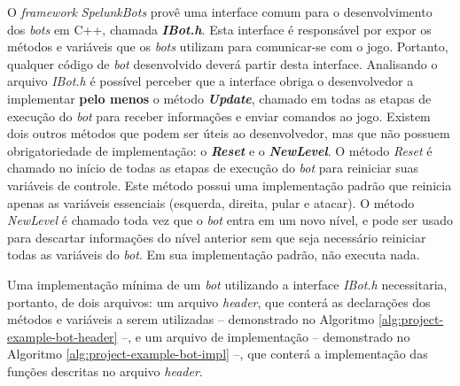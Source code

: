 O \textit{framework} \textit{SpelunkBots} provê uma interface comum para o
desenvolvimento dos \textit{bots} em C++, chamada \textbf{\textit{IBot.h}}. Esta
interface é responsável por expor os métodos e variáveis que os \textit{bots}
utilizam para comunicar-se com o jogo. Portanto, qualquer código de \textit{bot}
desenvolvido deverá partir desta interface. Analisando o arquivo \textit{IBot.h}
é possível perceber que a interface obriga o desenvolvedor a implementar
\textbf{pelo menos} o método \textbf{\textit{Update}}, chamado em todas as
etapas de execução do \textit{bot} para receber informações e enviar comandos ao
jogo. Existem dois outros métodos que podem ser úteis ao desenvolvedor, mas que
não possuem obrigatoriedade de implementação: o \textbf{\textit{Reset}} e o
\textbf{\textit{NewLevel}}. O método \textit{Reset} é chamado no início de todas
as etapas de execução do \textit{bot} para reiniciar suas variáveis de controle.
Este método possui uma implementação padrão que reinicia apenas as variáveis
essenciais (esquerda, direita, pular e atacar). O método \textit{NewLevel} é
chamado toda vez que o \textit{bot} entra em um novo nível, e pode ser usado
para descartar informações do nível anterior sem que seja necessário reiniciar
todas as variáveis do \textit{bot}. Em sua implementação padrão, não executa
nada.

Uma implementação mínima de um \textit{bot} utilizando a interface
\textit{IBot.h} necessitaria, portanto, de dois arquivos: um arquivo
\textit{header}, que conterá as declarações dos métodos e variáveis a serem
utilizadas -- demonstrado no Algoritmo \ref{alg:project-example-bot-header} --,
e um arquivo de implementação -- demonstrado no Algoritmo
\ref{alg:project-example-bot-impl} --, que conterá a implementação das funções
descritas no arquivo \textit{header}.
